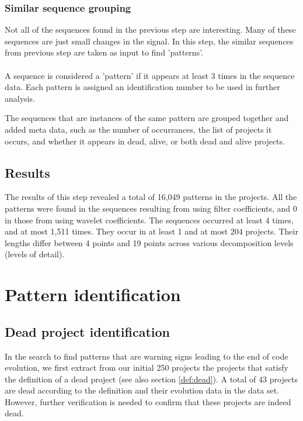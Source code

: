 \subsubsection{Similar sequence grouping}
\label{def:pattern}
Not all of the sequences found in the previous step are interesting. Many of
these sequences are just small changes in the signal. In this step, the similar
sequences from previous step are taken as input to find 'patterns'.

\paragraph{}
A sequence is considered a 'pattern' if it appears at least 3 times in the
sequence data. Each pattern is assigned an identification number to be used in
further analysis.

The sequences that are instances of the same pattern are grouped together and
added meta data, such as the number of occurrances, the list of projects
it occurs, and whether it appears in dead, alive, or both dead and alive
projects.

\subsection{Results}
The results of this step revealed a total of 16,049 patterns in the projects.
All the patterns were found in the sequences resulting from using filter
coefficients, and 0 in those from using wavelet coefficients. The sequences
occurred at least 4 times, and at most 1,511 times. They occur in at least 1
and at most 204 projects. Their lengths differ between 4 points and 19 points
across various decomposition levels (levels of detail).

\section{Pattern identification}
\subsection{Dead project identification}
In the search to find patterns that are warning signs leading to the end of
code evolution, we first extract from our initial 250 projects the projects
that satisfy the definition of a dead project (see also section \ref{def:dead}).
A total of 43 projects are dead according to the definition and their evolution
data in the data set. However, further verification is needed to confirm that
these projects are indeed dead.

